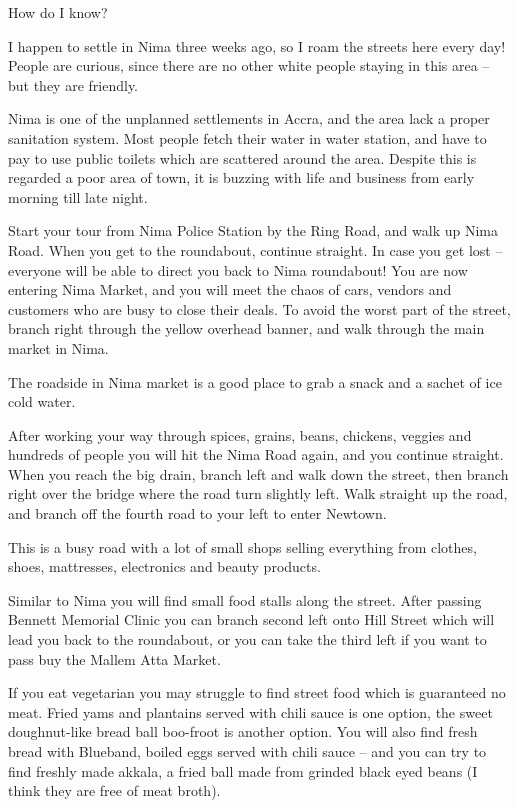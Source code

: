 How do I know?

I happen to settle in Nima three weeks ago, so I roam the streets here every day! People are curious, since there are no other white people staying in this area – but they are friendly.

Nima is one of the unplanned settlements in Accra, and the area lack a proper sanitation system. Most people fetch their water in water station, and have to pay to use public toilets which are scattered around the area. Despite this is regarded a poor area of town, it is buzzing with life and business from early morning till late night.

 

Start your tour from Nima Police Station by the Ring Road, and walk up Nima Road. When you get to the roundabout, continue straight. In case you get lost – everyone will be able to direct you back to Nima roundabout! You are now entering Nima Market, and you will meet the chaos of cars, vendors and customers who are busy to close their deals. To avoid the worst part of the street, branch right through the yellow overhead banner, and walk through the main market in Nima.

The roadside in Nima market is a good place to grab a snack and a sachet of ice cold water.

 

After working your way through spices, grains, beans, chickens, veggies and hundreds of people you will hit the Nima Road again, and you continue straight.  When you reach the big drain, branch left and walk down the street, then branch right over the bridge where the road turn slightly left. Walk straight up the road, and branch off the fourth road to your left to enter Newtown.

This is a busy road with a lot of small shops selling everything from clothes, shoes, mattresses, electronics and beauty products.

Similar to Nima you will find small food stalls along the street. After passing Bennett Memorial Clinic you can branch second left onto Hill Street which will lead you back to the roundabout, or you can take the third left if you want to pass buy the Mallem Atta Market.

 

If you eat vegetarian you may struggle to find street food which is guaranteed no meat. Fried yams and plantains served with chili sauce is one option, the sweet doughnut-like bread ball boo-froot is another option. You will also find fresh bread with Blueband, boiled eggs served with chili sauce – and you can try to find freshly made akkala, a fried ball made from grinded black eyed beans (I think they are free of meat broth).

